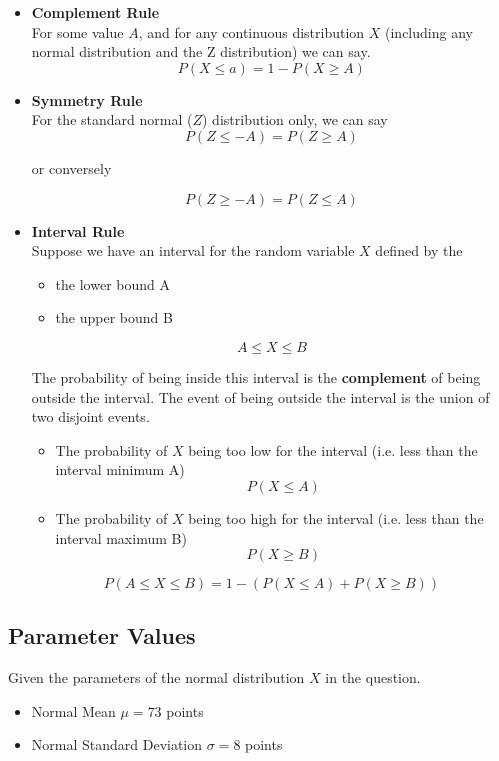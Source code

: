 \documentclass[12pts]{article}
\begin{document}
\begin{itemize}

\item \textbf{Complement Rule}\\
For some value $A$, and for any continuous distribution $X$ (including any normal distribution and the Z distribution) we can say.
\[ P(X \leq a) = 1 - P(X \geq A) \]

\item \textbf{Symmetry Rule}\\
For the standard normal ($Z$) distribution only, we can say
 \[ P(Z \leq -A) = P(Z \geq A) \]

or conversely

\[ P(Z \geq -A) = P(Z \leq A) \]


\item \textbf{Interval Rule}\\

Suppose we have an interval for the random variable $X$ defined by the 
\begin{itemize}
\item the lower bound A
\item the upper bound B
\end{itemize}

\[ A \leq X \leq B \]

The probability of being inside this interval is the \textbf{complement} of being outside the interval.
The event of being outside the interval is the union of two disjoint events.

\begin{itemize}
\item The probability of $X$ being too low for the interval (i.e. less than the interval minimum A)
\[ P(X \leq A) \]
\item The probability of $X$ being too high for the interval (i.e. less than the interval maximum B)
\[ P(X \geq B ) \]
\end{itemize}


\[ P(A \leq X \leq B) = 1 - ( P(X \leq A) +  P(X \geq B ) ) \]
\end{itemize}

\subsection*{Parameter Values}

Given the parameters of the normal distribution $X$ in the question.
\begin{itemize}
\item Normal Mean $\mu = 73$ points
\item Normal Standard Deviation $\sigma = 8$ points
\end{itemize}
\end{document}
